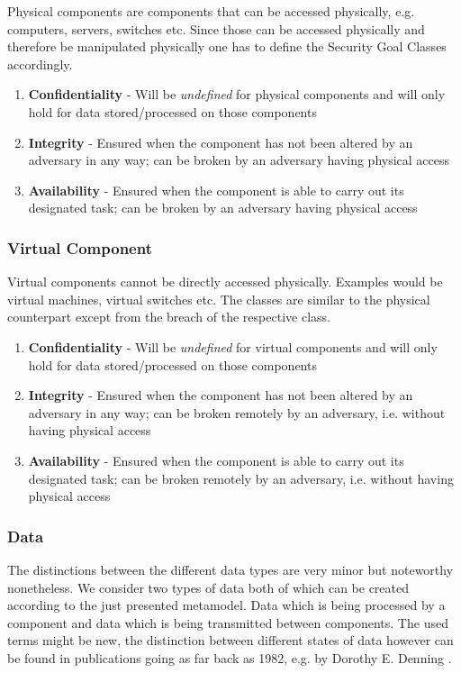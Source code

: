 Physical components are components that can be accessed physically, e.g. computers, servers, switches etc. Since those can be accessed physically and therefore be manipulated physically one has to define the Security Goal Classes accordingly.

\begin{enumerate}
\item \textbf{Confidentiality} - Will be \textit{undefined} for physical components and will only hold for data stored/processed on those components
\item \textbf{Integrity} - Ensured when the component has not been altered by an adversary in any way; can be broken by an adversary having physical access
\item \textbf{Availability} - Ensured when the component is able to carry out its designated task; can be broken by an adversary having physical access
\end{enumerate}

\subsubsection*{Virtual Component}

Virtual components cannot be directly accessed physically. Examples would be virtual machines, virtual switches etc. The classes are similar to the physical counterpart except from the breach of the respective class.

\begin{enumerate}
\item \textbf{Confidentiality} - Will be \textit{undefined} for virtual components and will only hold for data stored/processed on those components
\item \textbf{Integrity} - Ensured when the component has not been altered by an adversary in any way; can be broken remotely by an adversary, i.e. without having physical access
\item \textbf{Availability} - Ensured when the component is able to carry out its designated task; can be broken remotely by an adversary, i.e. without having physical access
\end{enumerate}

\subsubsection{Data}

The distinctions between the different data types are very minor but noteworthy nonetheless. We consider two types of data both of which can be created according to the just presented metamodel. Data which is being processed by a component and data which is being transmitted between components. The used terms might be new, the distinction between different states of data however can be found in publications going as far back as 1982, e.g. by Dorothy E. Denning \cite{robling1982cryptography}.

